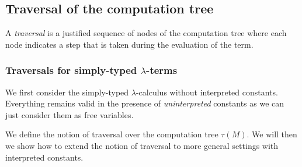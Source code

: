 \subsection{Traversal of the computation tree}
\label{subsec:traversal}
A \emph{traversal} is a justified sequence of nodes of the computation tree where each node indicates a step that is taken during the evaluation of the term.

\subsubsection{Traversals for simply-typed $\lambda$-terms}

We first consider the simply-typed $\lambda$-calculus without interpreted constants.
Everything remains valid in the presence of \emph{uninterpreted} constants as we can just
consider them as free variables.

We define the notion of traversal over the computation tree $\tau(M)$.
We will then we show how to extend the notion of traversal to more general settings with interpreted constants.

